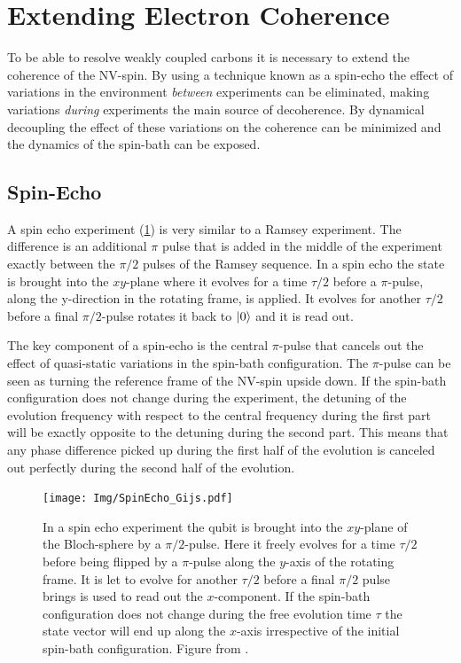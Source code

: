 \section{Extending Electron Coherence}

To be able to resolve weakly coupled carbons it is necessary to extend the coherence of the NV-spin.
By using a technique known as a spin-echo the effect of variations in the environment \emph{between} experiments can be eliminated, making variations \emph{during} experiments the main source of decoherence.
By dynamical decoupling the effect of these variations on the coherence can be minimized and the dynamics of the spin-bath can be exposed.


\subsection{Spin-Echo}

A spin echo experiment (\cref{fig:spin_echo_gijs}) is very similar to a Ramsey experiment.
The difference is an additional $\pi$ pulse that is added in the middle of the experiment exactly between the $\pi/2$ pulses of the Ramsey sequence.
In a spin echo the state is brought into the $xy$-plane where it evolves for a time $\tau/2$ before a $\pi$-pulse, along the y-direction in the rotating frame, is applied.
It evolves for another $\tau/2$ before a final $\pi/2$-pulse rotates it back to ${\left\vert{0}\right\rangle}$ and it is read out.

The key component of a spin-echo is the central $\pi$-pulse that cancels out the effect of quasi-static variations in the spin-bath configuration.
The $\pi$-pulse can be seen as turning the reference frame of the NV-spin upside down.
If the spin-bath configuration does not change during the experiment, the detuning of the evolution frequency with respect to the central frequency during the first part will be exactly opposite to the detuning during the second part.
This means that any phase difference picked up during the first half of the evolution is canceled out perfectly during the second half of the evolution.
\begin{figure}[htbp]
    \centering
    \texttt{[image: Img/SpinEcho\_Gijs.pdf]}
    \caption{In a spin echo experiment the qubit is brought into the $xy$-plane of the Bloch-sphere by a $\pi/2$-pulse. Here it freely evolves for a time $\tau/2$ before being flipped by a $\pi$-pulse along the $y$-axis of the rotating frame. It is let to evolve for another $\tau/2$ before a final $\pi/2$ pulse brings is used to read out the $x$-component.
    If the spin-bath configuration does not change during the free evolution time $\tau$ the state vector will end up along the $x$-axis irrespective of the initial spin-bath configuration.
    Figure from \citet{Lange2012Quantum}. }
    \label{fig:spin_echo_gijs}
\end{figure}


